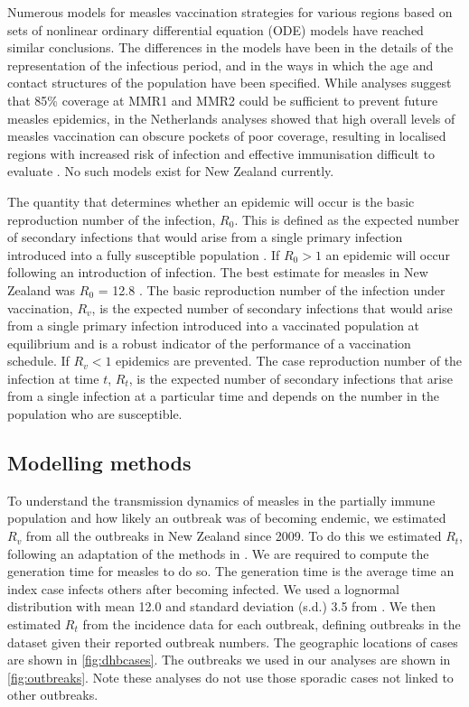 \documentclass{article}
\begin{document}
Numerous models for measles vaccination strategies for various regions \citep{agur93, babad95, edmunds0, gay98, wallinga1} based on sets of nonlinear ordinary differential equation (ODE) models have reached similar conclusions. The differences in the models have been in the details of the representation of the infectious period, and in the ways in which the age and contact structures of the population have been specified. While analyses suggest that 85\% coverage at MMR1 and MMR2 could be sufficient to prevent future measles epidemics, in the Netherlands analyses showed that high overall levels of measles vaccination can obscure pockets of poor coverage, resulting in localised regions with increased risk of infection and effective immunisation difficult to evaluate \citep{glass4}. No such models exist for New Zealand currently.

The quantity that determines whether an epidemic will occur is the basic reproduction number of the infection, $R_0$. This is defined as the expected number of secondary infections that would arise from a single primary infection introduced into a fully susceptible population \citep{anderson91, diekmann13}. If $R_0 > 1$ an epidemic will occur following an introduction of infection. The best estimate for measles in New Zealand was $R_0$ = 12.8 \citep{roberts4}. The basic reproduction number of the infection under vaccination, $R_v$, is the expected number of secondary infections that would arise from a single primary infection introduced into a vaccinated population at equilibrium and is a robust indicator of the performance of a vaccination schedule. If $R_v < 1$ epidemics are prevented. The case reproduction number of the infection at time $t$, $R_t$, is the expected number of secondary infections that arise from a single infection at a particular time and depends on the number in the population who are susceptible.

\subsection{Modelling methods}

To understand the transmission dynamics of measles in the partially immune population and how likely an outbreak was of becoming endemic, we estimated $R_v$ from all the outbreaks in New Zealand since 2009. To do this we estimated $R_t$, following an adaptation of the methods in \citep{obidia12,wallinga4}. We are required to compute the generation time for measles to do so. The generation time is the average time an index case infects others after becoming infected. We used a lognormal distribution with mean 12.0 and standard deviation (s.d.) 3.5 from \citep{klinkenberg11}. We then estimated $R_t$ from the incidence data for each outbreak, defining outbreaks in the dataset given their reported outbreak numbers. The geographic locations of cases are shown in \autoref{fig:dhbcases}. The outbreaks we used in our analyses are shown in \autoref{fig:outbreaks}. Note these analyses do not use those sporadic cases not linked to other outbreaks.
\end{document}
